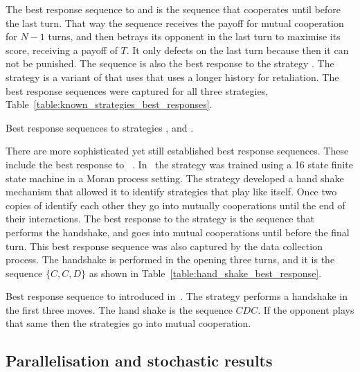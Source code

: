 The best response sequence to \TitForTat and \Grudger is the sequence that
cooperates until before the last turn. That way the sequence receives the payoff
for mutual cooperation for \(N - 1\) turns, and then betrays its opponent in the
last turn to maximise its score, receiving a payoff of \(T\). It only defects
on the last turn because then it can not be punished. The sequence is also the
best response to the strategy \HardTitForTat. The strategy is a variant of
\TitForTat that uses that uses a longer history for retaliation. The best response
sequences were captured for all three strategies,
Table~\ref{table:known_strategies_best_responses}.

\begin{table}[!htbp]
    \resizebox{\textwidth}{!}{
    }
    \caption{Best response sequences to strategies \TitForTat, \Grudger
    and \HardTitForTat.}
    \label{table:known_strategies_best_responses}
\end{table}

There are more sophisticated yet still established best response sequences.
These include the best response to \TFOne~\cite{Knight2018}. In~\cite{Knight2018}
the strategy \TFOne was trained using a 16 state finite state machine in a Moran
process setting. The \TFOne strategy developed a hand shake mechanism that allowed
it to identify strategies that play like itself. Once two copies of \TFOne
identify each other they go into mutually cooperations until the end of their
interactions. The best response to the strategy is the sequence that performs
the handshake, and goes into mutual cooperations until before the final turn.
This best response sequence was also captured by the data collection process.
The handshake is performed in the opening three turns, and it is the sequence
\(\{C, C, D\}\) as shown in Table~\ref{table:hand_shake_best_response}.

\begin{table}[!htbp]
    \resizebox{\textwidth}{!}{
    }
    \caption{Best response sequence to \TFOne introduced in~\cite{Knight2018}. The strategy
    performs a handshake in the first three moves. The hand shake is the sequence
    \(CDC\). If the opponent plays that same then the strategies go into mutual
    cooperation.}\label{table:hand_shake_best_response}
\end{table}

\subsection{Parallelisation and stochastic results}


